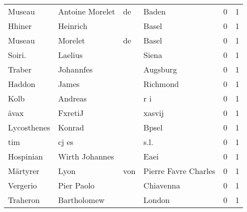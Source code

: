 \begin{tabular}{llllrr}
                   Museau &                    Antoine Morelet &          de &                                       Baden &          0 &         1 \\
                   Hhiner &                           Heinrich &             &                                       Basel &          0 &         1 \\
                   Museau &                            Morelet &          de &                                       Basel &          0 &         1 \\
                   Soiri. &                            Laelius &             &                                       Siena &          0 &         1 \\
                   Traber &                          Johannfes &             &                                    Augsburg &          0 &         1 \\
                   Haddon &                              James &             &                                    Richmond &          0 &         1 \\
                     Kolb &                            Andreas &             &                                         r i &          0 &         1 \\
                     ävax &                            FxretiJ &             &                                      xasvij &          0 &         1 \\
              Lycosthenes &                             Konrad &             &                                       Bpsel &          0 &         1 \\
                      tim &                              cj es &             &                                        s.l. &          0 &         1 \\
                Hospinian &                     Wirth Johannes &             &                                        Eaei &          0 &         1 \\
                 Märtyrer &                               Lyon &         von &                        Pierre Favre Charles &          0 &         1 \\
                 Vergerio &                         Pier Paolo &             &                                   Chiavenna &          0 &         1 \\
                 Traheron &                        Bartholomew &             &                                      London &          0 &         1 \\

\end{tabular}
